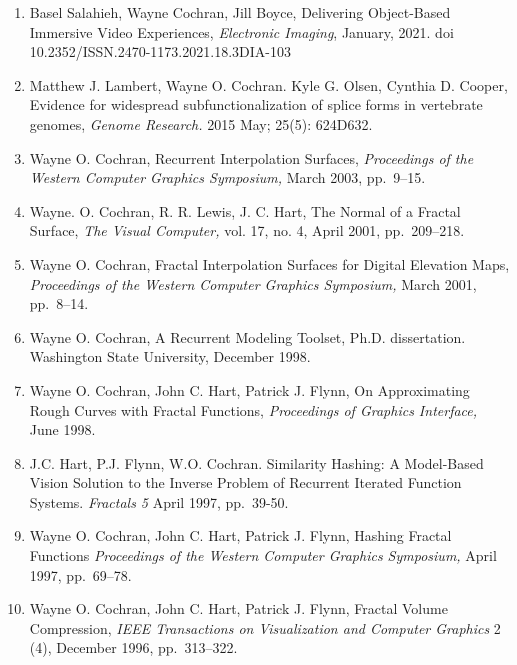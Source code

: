 \documentclass[10pt]{article}
\begin{document}
\begin{enumerate}

\item Basel Salahieh, Wayne Cochran, Jill Boyce,
    Delivering Object-Based Immersive Video Experiences,
    {\em Electronic Imaging}, January, 2021.
    doi 10.2352/ISSN.2470-1173.2021.18.3DIA-103

\item Matthew J. Lambert, Wayne O. Cochran. Kyle G. Olsen, Cynthia D. Cooper,
  Evidence for widespread subfunctionalization of splice forms in vertebrate genomes,
  {\em Genome Research.} 2015 May; 25(5): 624D632.

\item Wayne O. Cochran,
Recurrent Interpolation Surfaces,
{\em Proceedings of the Western Computer Graphics Symposium,}
March 2003, pp.~9--15.

\item Wayne. O. Cochran, R. R. Lewis, J. C. Hart,
The Normal of a Fractal Surface,
{\em The Visual Computer,} vol. 17, no. 4, April 2001, pp.~209--218.

\item Wayne O. Cochran,
Fractal Interpolation Surfaces for Digital Elevation Maps,
{\em Proceedings of the Western Computer Graphics Symposium,}
March 2001, pp.~8--14.

\item Wayne O. Cochran,
A Recurrent Modeling Toolset, Ph.D. dissertation.
Washington State University, December 1998.

\item
Wayne O. Cochran, John C. Hart, Patrick J. Flynn,
On Approximating Rough Curves with Fractal Functions,
{\em Proceedings of Graphics Interface,}
June 1998.

\item
J.C. Hart, P.J. Flynn, W.O. Cochran. 
Similarity Hashing: A Model-Based Vision Solution to the Inverse 
Problem of Recurrent Iterated Function Systems. 
{\em Fractals 5} April 1997, pp.~39-50.

\item
Wayne O. Cochran, John C. Hart, Patrick J. Flynn,
Hashing Fractal Functions
{\em Proceedings of the Western Computer Graphics Symposium,}
April 1997, pp.~69--78.

\item
Wayne O. Cochran, John C. Hart, Patrick J. Flynn,
Fractal Volume Compression,
{\em IEEE Transactions on Visualization and Computer Graphics}
2 (4),
December 1996, pp.~313--322.


\end{enumerate}
\end{document}
